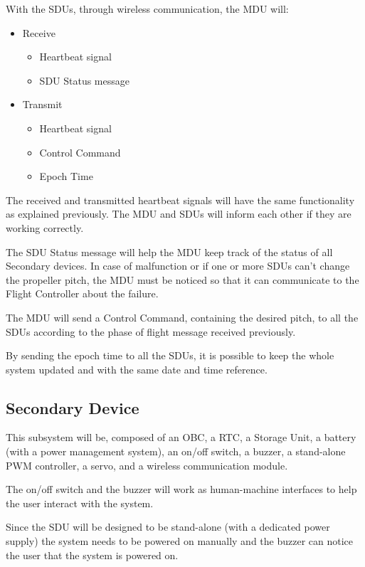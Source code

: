 With the SDUs, through wireless communication, the MDU will:
\begin{itemize}
    \item Receive
          \begin{itemize}
              \item Heartbeat signal
              \item SDU Status message
          \end{itemize}
    \item Transmit
          \begin{itemize}
              \item Heartbeat signal
              \item Control Command
              \item Epoch Time
          \end{itemize}
\end{itemize}

The received and transmitted heartbeat signals will have the same functionality as explained previously.
The MDU and SDUs will inform each other if they are working correctly.

The SDU Status message will help the MDU keep track of the status of all Secondary devices.
In case of malfunction or if one or more SDUs can't change the propeller pitch, the MDU must be noticed so that it can communicate to the Flight Controller about the failure.

The MDU will send a Control Command, containing the desired pitch, to all the SDUs according to the phase of flight message received previously.

By sending the epoch time to all the SDUs, it is possible to keep the whole system updated and with the same date and time reference.

\subsection{Secondary Device}
This subsystem will be, composed of an \gls{OBC}, a \gls{RTC}, a Storage Unit, a battery (with a power management system), an on/off switch, a buzzer, a stand-alone \gls{PWM} controller, a servo, and a wireless communication module.

The on/off switch and the buzzer will work as human-machine interfaces to help the user interact with the system.

Since the SDU will be designed to be stand-alone (with a dedicated power supply) the system needs to be powered on manually and the buzzer can notice the user that the system is powered on.

